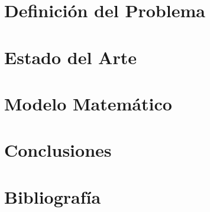 \documentclass[letter, 10pt]{article}
\begin{document}
\section{Definición del Problema}
\label{sec:definicion}


\section{Estado del Arte}
\label{sec:estado}


\section{Modelo Matemático}
\label{sec:modelo}


\section{Conclusiones}
\label{sec:conclusiones}


\section{Bibliografía}

\end{document}
